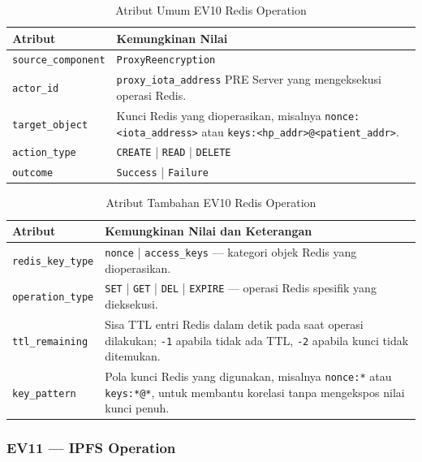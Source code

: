 \begin{table}[htbp]
\centering
\caption{Atribut Umum EV10 Redis Operation}
\label{tab:ev10-umum}
\renewcommand{\arraystretch}{1.3}
\begin{tabular}{|p{3.5cm}|p{8.5cm}|}
\hline
\textbf{Atribut} & \textbf{Kemungkinan Nilai} \\
\hline
\texttt{source\_component} &
\texttt{ProxyReencryption} \\
\hline
\texttt{actor\_id} &
\texttt{proxy\_iota\_address} PRE Server yang mengeksekusi operasi Redis. \\
\hline
\texttt{target\_object} &
Kunci Redis yang dioperasikan, misalnya
\texttt{nonce:<iota\_address>} atau
\texttt{keys:<hp\_addr>@<patient\_addr>}. \\
\hline
\texttt{action\_type} &
\texttt{CREATE} | \texttt{READ} | \texttt{DELETE} \\
\hline
\texttt{outcome} &
\texttt{Success} | \texttt{Failure} \\
\hline
\end{tabular}
\end{table}

\begin{table}[htbp]
\centering
\caption{Atribut Tambahan EV10 Redis Operation}
\label{tab:ev10-detail}
\renewcommand{\arraystretch}{1.3}
\begin{tabular}{|p{4cm}|p{7.5cm}|}
\hline
\textbf{Atribut} & \textbf{Kemungkinan Nilai dan Keterangan} \\
\hline
\texttt{redis\_key\_type} &
\texttt{nonce} | \texttt{access\_keys} --- kategori objek Redis yang
dioperasikan. \\
\hline
\texttt{operation\_type} &
\texttt{SET} | \texttt{GET} | \texttt{DEL} | \texttt{EXPIRE} ---
operasi Redis spesifik yang dieksekusi. \\
\hline
\texttt{ttl\_remaining} &
Sisa TTL entri Redis dalam detik pada saat operasi dilakukan;
\texttt{-1} apabila tidak ada TTL, \texttt{-2} apabila kunci tidak ditemukan. \\
\hline
\texttt{key\_pattern} &
Pola kunci Redis yang digunakan, misalnya \texttt{nonce:*} atau
\texttt{keys:*@*}, untuk membantu korelasi tanpa mengekspos nilai kunci
penuh. \\
\hline
\end{tabular}
\end{table}

\subsubsection{EV11 --- IPFS Operation}
\label{subsec:ev11-ipfs-operation}

